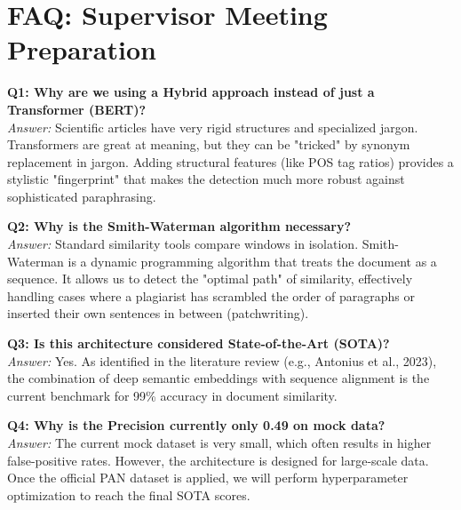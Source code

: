 \documentclass[11pt,a4paper]{article}
\begin{document}
\newpage
\section{FAQ: Supervisor Meeting Preparation}

\textbf{Q1: Why are we using a Hybrid approach instead of just a Transformer (BERT)?} \\
\textit{Answer:} Scientific articles have very rigid structures and specialized jargon. Transformers are great at meaning, but they can be "tricked" by synonym replacement in jargon. Adding structural features (like POS tag ratios) provides a stylistic "fingerprint" that makes the detection much more robust against sophisticated paraphrasing.

\textbf{Q2: Why is the Smith-Waterman algorithm necessary?} \\
\textit{Answer:} Standard similarity tools compare windows in isolation. Smith-Waterman is a dynamic programming algorithm that treats the document as a sequence. It allows us to detect the "optimal path" of similarity, effectively handling cases where a plagiarist has scrambled the order of paragraphs or inserted their own sentences in between (patchwriting).

\textbf{Q3: Is this architecture considered State-of-the-Art (SOTA)?} \\
\textit{Answer:} Yes. As identified in the literature review (e.g., Antonius et al., 2023), the combination of deep semantic embeddings with sequence alignment is the current benchmark for 99\% accuracy in document similarity.

\textbf{Q4: Why is the Precision currently only 0.49 on mock data?} \\
\textit{Answer:} The current mock dataset is very small, which often results in higher false-positive rates. However, the architecture is designed for large-scale data. Once the official PAN dataset is applied, we will perform hyperparameter optimization to reach the final SOTA scores.
\end{document}
